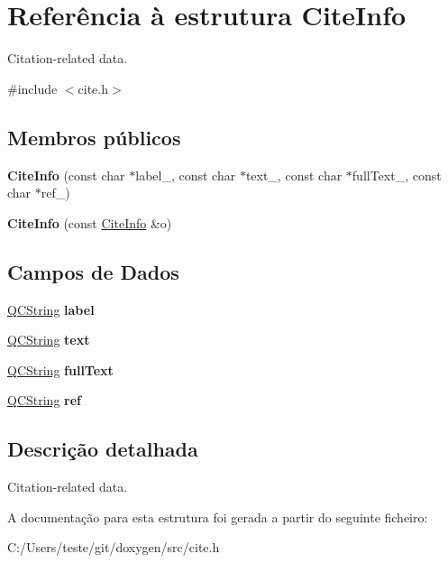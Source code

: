 \hypertarget{struct_cite_info}{\section{Referência à estrutura Cite\-Info}
\label{struct_cite_info}
}


Citation-\/related data.  




{\ttfamily \#include $<$cite.\-h$>$}

\subsection*{Membros públicos}
\begin{DoxyCompactItemize}
\item 
\hypertarget{struct_cite_info_a54e566b1bb6463ba38ad08e89c882161}{{\bfseries Cite\-Info} (const char $\ast$label\-\_\-, const char $\ast$text\-\_, const char $\ast$full\-Text\-\_, const char $\ast$ref\-\_)}\label{struct_cite_info_a54e566b1bb6463ba38ad08e89c882161}

\item 
\hypertarget{struct_cite_info_a17fbd7dd6140b478f805389601caa21c}{{\bfseries Cite\-Info} (const \hyperlink{struct_cite_info}{Cite\-Info} \&o)}\label{struct_cite_info_a17fbd7dd6140b478f805389601caa21c}

\end{DoxyCompactItemize}
\subsection*{Campos de Dados}
\begin{DoxyCompactItemize}
\item 
\hypertarget{struct_cite_info_ad961cc9bd17b7533dc02fe0826647dc7}{\hyperlink{class_q_c_string}{Q\-C\-String} {\bfseries label}}\label{struct_cite_info_ad961cc9bd17b7533dc02fe0826647dc7}

\item 
\hypertarget{struct_cite_info_a4699e75142e13e15b0f7c9ada64258c3}{\hyperlink{class_q_c_string}{Q\-C\-String} {\bfseries text}}\label{struct_cite_info_a4699e75142e13e15b0f7c9ada64258c3}

\item 
\hypertarget{struct_cite_info_aaf22d92ca78ac9c777bce05e9f111ce4}{\hyperlink{class_q_c_string}{Q\-C\-String} {\bfseries full\-Text}}\label{struct_cite_info_aaf22d92ca78ac9c777bce05e9f111ce4}

\item 
\hypertarget{struct_cite_info_a12b5232acab32ee40a197f72270d4ad1}{\hyperlink{class_q_c_string}{Q\-C\-String} {\bfseries ref}}\label{struct_cite_info_a12b5232acab32ee40a197f72270d4ad1}

\end{DoxyCompactItemize}


\subsection{Descrição detalhada}
Citation-\/related data. 

A documentação para esta estrutura foi gerada a partir do seguinte ficheiro\-:\begin{DoxyCompactItemize}
\item 
C\-:/\-Users/teste/git/doxygen/src/cite.\-h\end{DoxyCompactItemize}
